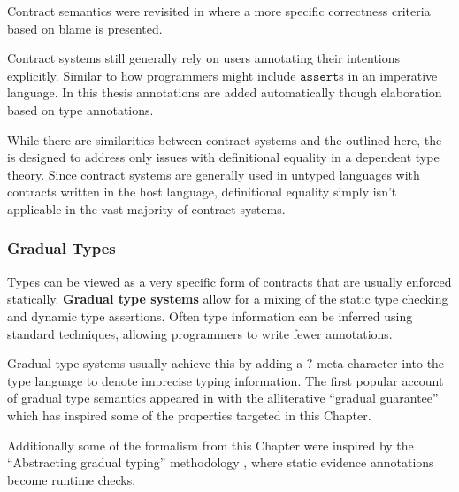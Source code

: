 Contract semantics were revisited in \cite{10.1145/1925844.1926410,10.1007/978-3-642-28869-2_11} where a more specific correctness criteria based on blame is presented.

Contract systems still generally rely on users annotating their intentions explicitly.
Similar to how programmers might include $\mathtt{assert}$s in an imperative language.
In this thesis annotations are added automatically though elaboration based on type annotations.
 
While there are similarities between contract systems and the \csys{} outlined here, the \csys{} is designed to address only issues with definitional equality in a dependent type theory.
Since contract systems are generally used in untyped languages with contracts written in the host language, definitional equality simply isn't applicable in the vast majority of contract systems.


\subsubsection{Gradual Types}
 
Types can be viewed as a very specific form of contracts that are usually enforced statically.
\textbf{Gradual type systems} allow for a mixing of the static type checking and dynamic type assertions.
Often type information can be inferred using standard techniques, allowing programmers to write fewer annotations.
 
Gradual type systems usually achieve this by adding a $?$ meta character into the type language to denote imprecise typing information.
The first popular account of gradual type semantics appeared in \cite{siek_et_al:LIPIcs:2015:5031} with the alliterative ``gradual guarantee'' which has inspired some of the properties targeted in this Chapter.
 
 
Additionally some of the formalism from this Chapter were inspired by the ``Abstracting gradual typing'' methodology \cite{10.1145/2837614.2837670}, where static evidence annotations become runtime checks.
 
